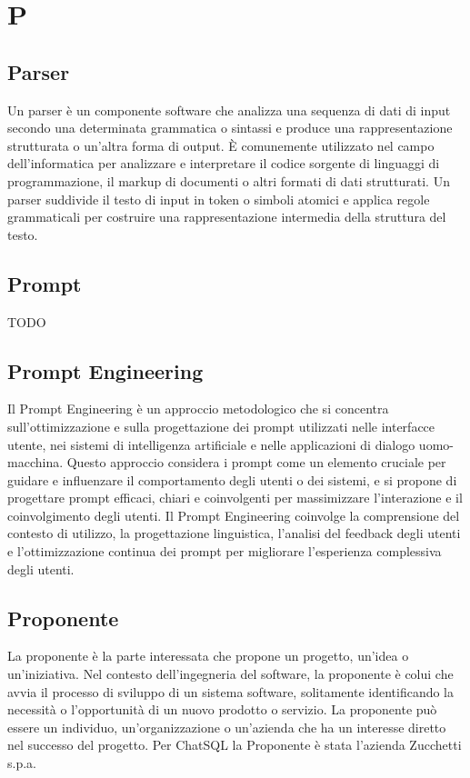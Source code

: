\section{P}


\vspace{2em}
\subsection*{Parser}
Un parser è un componente software che analizza una sequenza di dati di input secondo una determinata grammatica o sintassi e produce una rappresentazione strutturata o un'altra forma di output. È comunemente utilizzato nel campo dell'informatica per analizzare e interpretare il codice sorgente di linguaggi di programmazione, il markup di documenti o altri formati di dati strutturati. Un parser suddivide il testo di input in token o simboli atomici e applica regole grammaticali per costruire una rappresentazione intermedia della struttura del testo. 

\vspace{2em}
\subsection*{Prompt}
TODO

\vspace{2em}
\subsection*{Prompt Engineering}
Il Prompt Engineering è un approccio metodologico che si concentra sull'ottimizzazione e sulla progettazione dei prompt utilizzati nelle interfacce utente, nei sistemi di intelligenza artificiale e nelle applicazioni di dialogo uomo-macchina. Questo approccio considera i prompt come un elemento cruciale per guidare e influenzare il comportamento degli utenti o dei sistemi, e si propone di progettare prompt efficaci, chiari e coinvolgenti per massimizzare l'interazione e il coinvolgimento degli utenti. Il Prompt Engineering coinvolge la comprensione del contesto di utilizzo, la progettazione linguistica, l'analisi del feedback degli utenti e l'ottimizzazione continua dei prompt per migliorare l'esperienza complessiva degli utenti.

\vspace{2em}
\subsection*{Proponente}
La proponente è la parte interessata che propone un progetto, un'idea o un'iniziativa. Nel contesto dell'ingegneria del software, la proponente è colui che avvia il processo di sviluppo di un sistema software, solitamente identificando la necessità o l'opportunità di un nuovo prodotto o servizio. La proponente può essere un individuo, un'organizzazione o un'azienda che ha un interesse diretto nel successo del progetto. Per ChatSQL la Proponente è stata l'azienda Zucchetti s.p.a.  

